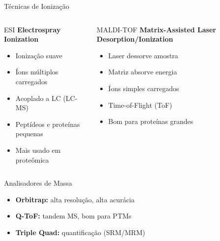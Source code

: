\begin{frame}[shrink=10]{Técnicas de Ionização}
\begin{columns}
\begin{block}{ESI}
\textbf{Electrospray Ionization}
\begin{itemize}
    \item Ionização suave
    \item Íons múltiplos carregados
    \item Acoplado a LC (LC-MS)
    \item Peptídeos e proteínas pequenas
    \item Mais usado em proteômica
\end{itemize}
\end{block}

\begin{block}{MALDI-TOF}
\textbf{Matrix-Assisted Laser Desorption/Ionization}
\begin{itemize}
    \item Laser dessorve amostra
    \item Matriz absorve energia
    \item Íons simples carregados
    \item Time-of-Flight (ToF)
    \item Bom para proteínas grandes
\end{itemize}
\end{block}
\end{columns}

\vspace{0.3cm}

\begin{block}{Analisadores de Massa}
\begin{itemize}
    \item \textbf{Orbitrap:} alta resolução, alta acurácia
    \item \textbf{Q-ToF:} tandem MS, bom para PTMs
    \item \textbf{Triple Quad:} quantificação (SRM/MRM)
\end{itemize}
\end{block}
\end{frame}

